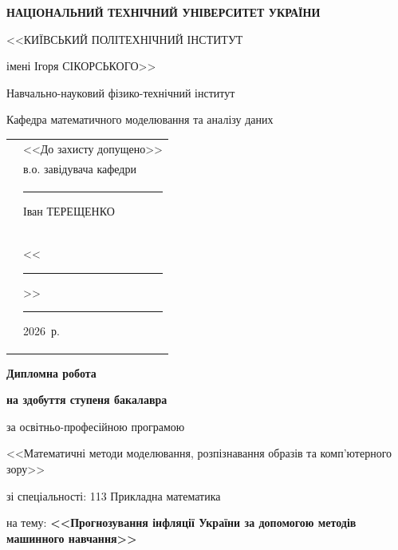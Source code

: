 \documentclass[a4paper,ukrainian,oneside]{extreport}
\newcommand{\setfontsize}[1]{\fontsize{#1pt}{#1pt}\selectfont}
\newcommand{\reportTitle}{Прогнозування інфляції України за допомогою методів машинного навчання}
\newcommand{\YearOfDefence}{2026}
\begin{document}
\pagestyle{plain}
\setfontsize{14}

\thispagestyle{empty}
\linespread{1.1}

\begin{center}
{\bfseries
НАЦІОНАЛЬНИЙ ТЕХНІЧНИЙ УНІВЕРСИТЕТ УКРАЇНИ \par
<<КИЇВСЬКИЙ ПОЛІТЕХНІЧНИЙ ІНСТИТУТ \par
імені Ігоря СІКОРСЬКОГО>>\par
Навчально-науковий фізико-технічний інститут\par
\medskip
Кафедра математичного моделювання та аналізу даних\par
}
\end{center}

\vspace{5mm}

\begin{tabularx}{\textwidth}{XX}
                       & <<До захисту допущено>> \\[06pt]
                       & в.о. завідувача кафедри \\[06pt]
                       & \rule{2.5cm}{0.25pt} Іван ТЕРЕЩЕНКО \\[06pt]
                       & <<\rule{0.5cm}{0.25pt}>> \rule{2.5cm}{0.25pt} \YearOfDefence~р.
\end{tabularx}

\begin{center}
\vspace{5mm}
{\bfseries\huge Дипломна робота} \par
{\bfseries на здобуття ступеня бакалавра} \par
за освітньо-професійною програмою \par
<<Математичні методи моделювання, розпізнавання образів та комп'ютерного зору>> \par
\end{center}

зі спеціальності: 113 Прикладна математика \par
на тему: \textbf{<<\reportTitle>>}

\vspace{5mm}
\end{document}

